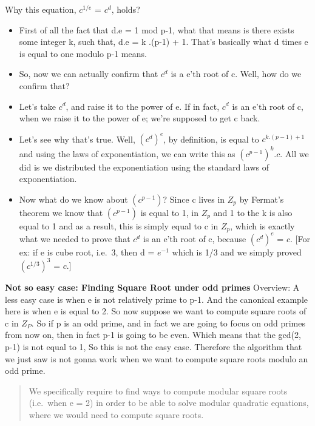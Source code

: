 \documentclass[11pt]{article}
\providecommand{\tightlist}{%
      \setlength{\itemsep}{0pt}\setlength{\parskip}{0pt}}
\begin{document}
Why this equation, \(c^{1/e}\) = \(c^{d}\), holds?

\begin{itemize}
\tightlist
\item
  First of all the fact that d.e = 1 mod p-1, what that means is there
  exists some integer k, such that, d.e = k .(p-1) + 1. That's basically
  what d times e is equal to one modulo p-1 means.
\item
  So, now we can actually confirm that \(c^{d}\) is a e'th root of c.
  Well, how do we confirm that?
\item
  Let's take \(c^{d}\), and raise it to the power of e. If in fact,
  \(c^{d}\) is an e'th root of c, when we raise it to the power of e;
  we're supposed to get c back.
\item
  Let's see why that's true. Well, \((c^{d})^{e}\), by definition, is
  equal to \(c^{k.(p-1)+1}\) and using the laws of exponentiation, we
  can write this as \((c^{p-1})^{k}\).\(c\). All we did is we
  distributed the exponentiation using the standard laws of
  exponentiation.
\item
  Now what do we know about \((c^{p-1})\)? Since c lives in \(Z_{p}\) by
  Fermat's theorem we know that \((c^{p-1})\) is equal to 1, in
  \(Z_{p}\) and 1 to the k is also equal to 1 and as a result, this is
  simply equal to c in \(Z_{p}\), which is exactly what we needed to
  prove that \(c^{d}\) is an e'th root of c, because \((c^{d})^{e}\) =
  \(c\). {[}For ex: if e is cube root, i.e.~3, then d = \(e^{-1}\) which
  is 1/3 and we simply proved \((c^{1/3})^{3}\) = \(c\).{]}
\end{itemize}

\textbf{Not so easy case: Finding Square Root under odd primes}
Overview: A less easy case is when e is not relatively prime to p-1. And
the canonical example here is when e is equal to 2. So now suppose we
want to compute square roots of c in \(Z_{P}\). So if p is an odd prime,
and in fact we are going to focus on odd primes from now on, then in
fact p-1 is going to be even. Which means that the gcd(2, p-1) is not
equal to 1, So this is not the easy case. Therefore the algorithm that
we just saw is not gonna work when we want to compute square roots
modulo an odd prime.

\begin{quote}
We specifically require to find ways to compute modular square roots
(i.e.~when e = 2) in order to be able to solve modular quadratic
equations, where we would need to compute square roots.
\end{quote}
\end{document}
